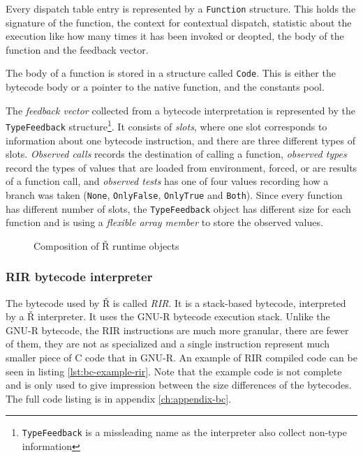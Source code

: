 Every dispatch table entry is represented by a \texttt{Function} structure. This holds the signature of the function, the context for contextual dispatch, statistic about the execution like how many times it has been invoked or deopted, the body of the function and the feedback vector.

The body of a function is stored in a structure called \texttt{Code}. This is either the bytecode body or a pointer to the native function, and the constants pool.

The \textit{feedback vector} collected from a bytecode interpretation is represented by the \texttt{TypeFeedback} structure\footnote{\texttt{TypeFeedback} is a missleading name as the interpreter also collect non-type information}. It consists of \textit{slots}, where one slot corresponds to information about one bytecode instruction, and there are three different types of slots. \textit{Observed calls} records the destination of calling a function, \textit{observed types} record the types of values that are loaded from environment, forced, or are results of a function call, and \textit{observed tests} has one of four values recording how a branch was taken (\texttt{None}, \texttt{OnlyFalse}, \texttt{OnlyTrue} and \texttt{Both}). Since every function has different number of slots, the \texttt{TypeFeedback} object has different size for each function and is using a \textit{flexible array member}\cite{flexible-array} to store the observed values.

\begin{figure}
	\centering
	\caption{Composition of Ř runtime objects}\label{fig:rsh-composition}
\end{figure}

\subsubsection*{RIR bytecode interpreter}

The bytecode used by Ř is called \textit{RIR}. It is a stack-based bytecode, interpreted by a Ř interpreter. It uses the GNU-R bytecode execution stack. Unlike the GNU-R bytecode, the RIR instructions are much more granular, there are fewer of them, they are not as specialized and a single instruction represent much smaller piece of C code that in GNU-R. An example of RIR compiled code can be seen in listing \ref{lst:bc-example-rir}. Note that the example code is not complete and is only used to give impression between the size differences of the bytecodes. The full code listing is in appendix \ref{ch:appendix-bc}.


